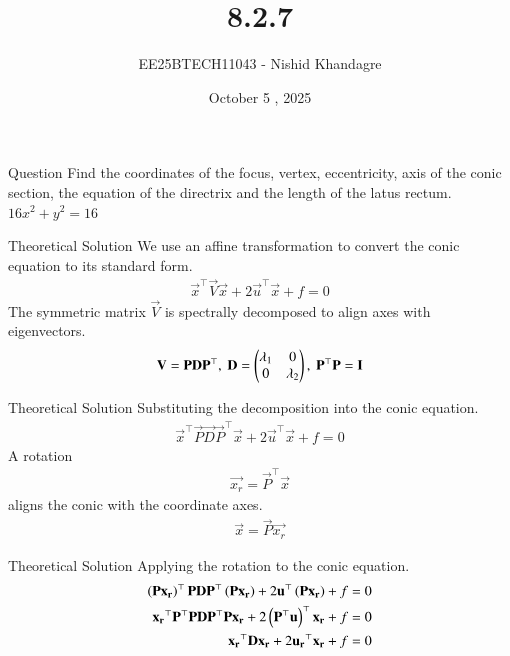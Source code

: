 \documentclass{beamer}
\title{8.2.7}
\date{October 5 , 2025}
\author{EE25BTECH11043 - Nishid Khandagre}
\begin{document}
\frame{\titlepage}

\begin{frame}{Question}
Find the coordinates of the focus, vertex, eccentricity, axis of the conic section, the equation of the directrix and the length of the latus rectum. \\
$16x^2 + y^2 = 16$
\end{frame}

\begin{frame}{Theoretical Solution}
We use an affine transformation to convert the conic equation to its standard form.
\begin{align}
    \vec{x}^\top\vec{V}\vec{x} + 2\vec{u}^\top\vec{x} + f = 0
\end{align}
The symmetric matrix $\vec{V}$ is spectrally decomposed to align axes with eigenvectors.
\begin{align}
    \mathbf{V} = \mathbf{P}\mathbf{D}\mathbf{P}^\top, \text{ } \mathbf{D} = \begin{pmatrix}\lambda_1 & 0 \\ 0 & \lambda_2\end{pmatrix}, \text{ } \mathbf{P}^\top\mathbf{P} = \mathbf{I}
\end{align}
\end{frame}

\begin{frame}{Theoretical Solution}
Substituting the decomposition into the conic equation.
\begin{align}
    \vec{x}^\top\vec{P}\vec{D}\vec{P}^\top\vec{x} + 2\vec{u}^\top\vec{x} + f = 0
\end{align}
A rotation
\begin{align}
    \vec{x_r} = \vec{P}^\top\vec{x} 
\end{align}
aligns the conic with the coordinate axes.
\begin{align}
    \vec{x} = \vec{P}\vec{x_r}
\end{align}
\end{frame}

\begin{frame}{Theoretical Solution}
Applying the rotation to the conic equation.
\begin{align}
    \left(\mathbf{P}\mathbf{x_r}\right)^\top\mathbf{P}\mathbf{D}\mathbf{P}^\top\left(\mathbf{P}\mathbf{x_r}\right) + 2\mathbf{u}^\top\left(\mathbf{P}\mathbf{x_r}\right) + f &= 0 \\
    \mathbf{x_r}^\top\mathbf{P}^\top\mathbf{P}\mathbf{D}\mathbf{P}^\top\mathbf{P}\mathbf{x_r} + 2\left(\mathbf{P}^\top\mathbf{u}\right)^\top\mathbf{x_r} + f &= 0 \\
    \mathbf{x_r}^\top\mathbf{D}\mathbf{x_r} + 2\mathbf{u_r}^\top\mathbf{x_r} + f &= 0
\end{align}
\end{frame}
\end{document}
